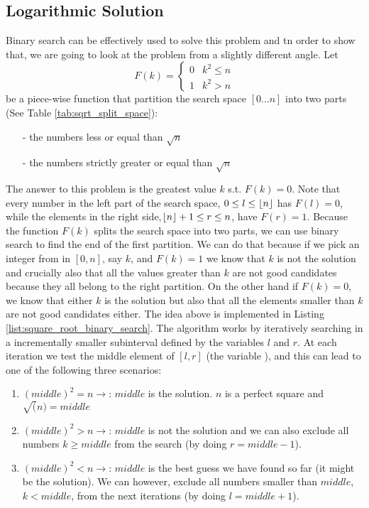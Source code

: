 	


\subsection{Logarithmic Solution}
Binary search can be effectively used to solve this problem and tn order to show that, we are going
to look at the problem from a slightly different angle. Let 
\begin{equation}
	F(k)=\begin{cases} 
	0 & k^2 \leq n \\
	1 & k^2 > n
\end{cases}
\label{eq:square_root_piecewice}
\end{equation} 
be a piece-wise function that partition the search space $[0\ldots n]$ into two parts (See Table
\ref{tab:sqrt_split_space}):
	\begin{itemize}
      \item [-] the numbers  less or equal than $\sqrt{n}$
      \item [-] the numbers strictly greater or equal than $\sqrt{n}$
	\end{itemize}
The answer to this problem is the greatest value $k$ s.t. $F(k) = 0$. 
Note that every number in the left part of the search space, $0 \leq l \leq \lfloor n\rfloor$ has $F(l) = 0$, while the elements in the right side,$\lfloor n\rfloor+1 \leq r \leq n$, have $F(r) = 1$.
Because the function $F(k)$ splits the search space into two parts, we can use
binary search to find the end of the first partition. 
We can do that because if we pick an integer from in $[0,n]$, say $k$, and $F(k) = 1$ we know that $k$ is not the solution and crucially also that
all the values greater than $k$ are not good candidates because they all belong to the right partition.
On the other hand if $F(k) = 0$, we know that either $k$ is the solution but also that all the elements smaller than $k$ are not good candidates either.
The idea above is implemented in Listing \ref{list:square_root_binary_search}. 
The algorithm works by iteratively searching in a
incrementally smaller subinterval defined by the variables $l$ and $r$. 
At each iteration we test the middle element of $[l,r]$ (the variable ), and this can lead to one of the following three scenarios:
\begin{enumerate}
 	\item $(middle)^2  = n \longrightarrow$: $middle$ is the solution. $n$ is a perfect square and
 	$\sqrt(n)=middle$
 	\item $(middle)^2  > n \longrightarrow$: $middle$ is not the solution and we can also exclude
 	all numbers $k \geq middle$ from the search (by doing $r = middle-1$).
 	\item $(middle)^2  < n \longrightarrow$: $middle$ is the best guess we have found so far (it might be the solution). We can
 	however, exclude all numbers smaller than $middle$, $k < middle$, from the next iterations (by doing $l = middle+1$).
\end{enumerate}
